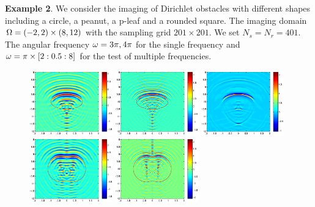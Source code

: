\documentclass[12pt]{iopart}
\begin{document}
{\bigskip
\textbf{Example 2}. We consider the imaging of Dirichlet obstacles with different shapes including a circle, a peanut, a p-leaf and a rounded square. The imaging domain $\Omega = (-2, 2) \times (8, 12)$ with the sampling grid $201 \times 201$. We set $N_s = N_r = 401$. The angular frequency $\omega = 3\pi,4\pi$ for the single frequency and $\omega=\pi\times[2:0.5:8]$ for the test of multiple frequencies.

\begin{figure}
	\centering
	\includegraphics[width=0.32\textwidth]{./graphic/circle_3pi.eps}
	\includegraphics[width=0.32\textwidth]{./graphic/circle_5pi.eps}
	\includegraphics[width=0.32\textwidth]{./graphic/circle.eps}
	\includegraphics[width=0.32\textwidth]{./graphic/peanut_3pi.eps}
	\includegraphics[width=0.32\textwidth]{./graphic/peanut_5pi.eps}

\end{figure}}
\end{document}
